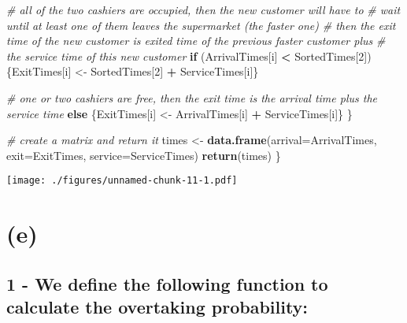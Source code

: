 \documentclass[]{article}
\newenvironment{Shaded}{\begin{snugshade}}{\end{snugshade}}
\newcommand{\CommentTok}[1]{\textcolor[rgb]{0.56,0.35,0.01}{\textit{#1}}}
\newcommand{\ControlFlowTok}[1]{\textcolor[rgb]{0.13,0.29,0.53}{\textbf{#1}}}
\newcommand{\DataTypeTok}[1]{\textcolor[rgb]{0.13,0.29,0.53}{#1}}
\newcommand{\DecValTok}[1]{\textcolor[rgb]{0.00,0.00,0.81}{#1}}
\newcommand{\FloatTok}[1]{\textcolor[rgb]{0.00,0.00,0.81}{#1}}
\newcommand{\KeywordTok}[1]{\textcolor[rgb]{0.13,0.29,0.53}{\textbf{#1}}}
\newcommand{\NormalTok}[1]{#1}
\newcommand{\OperatorTok}[1]{\textcolor[rgb]{0.81,0.36,0.00}{\textbf{#1}}}
\newcommand{\StringTok}[1]{\textcolor[rgb]{0.31,0.60,0.02}{#1}}
\begin{document}
\begin{Shaded}
\begin{Highlighting}[]
    \CommentTok{# all of the two cashiers are occupied, then the new customer will have to }
    \CommentTok{# wait until at least one of them leaves the supermarket (the faster one)}
    \CommentTok{# then the exit time of the new customer is exited time of the previous faster customer plus }
    \CommentTok{# the service time of this new customer}
    \ControlFlowTok{if}\NormalTok{ (ArrivalTimes[i] }\OperatorTok{<}\StringTok{ }\NormalTok{SortedTimes[}\DecValTok{2}\NormalTok{]) \{ExitTimes[i] <-}\StringTok{ }\NormalTok{SortedTimes[}\DecValTok{2}\NormalTok{] }\OperatorTok{+}\StringTok{ }\NormalTok{ServiceTimes[i]\}}
    
    \CommentTok{# one or two cashiers are free, then the exit time is the arrival time plus the service time}
    \ControlFlowTok{else}\NormalTok{ \{ExitTimes[i] <-}\StringTok{ }\NormalTok{ArrivalTimes[i] }\OperatorTok{+}\StringTok{ }\NormalTok{ServiceTimes[i]\}}
\NormalTok{  \}}
  
  \CommentTok{# create a matrix and return it}
\NormalTok{  times <-}\StringTok{ }\KeywordTok{data.frame}\NormalTok{(}\DataTypeTok{arrival=}\NormalTok{ArrivalTimes,}
                      \DataTypeTok{exit=}\NormalTok{ExitTimes,}
                      \DataTypeTok{service=}\NormalTok{ServiceTimes)}
  \KeywordTok{return}\NormalTok{(times)}
\NormalTok{\}}
\end{Highlighting}
\end{Shaded}

\begin{Shaded}
\end{Shaded}

\texttt{[image: ./figures/unnamed-chunk-11-1.pdf]}

\newpage

\hypertarget{e}{%
\section{(e)}\label{e}}

\hypertarget{we-define-the-following-function-to-calculate-the-overtaking-probability}{%
\subsection{1 - We define the following function to calculate the
overtaking
probability:}\label{we-define-the-following-function-to-calculate-the-overtaking-probability}}
\end{document}

